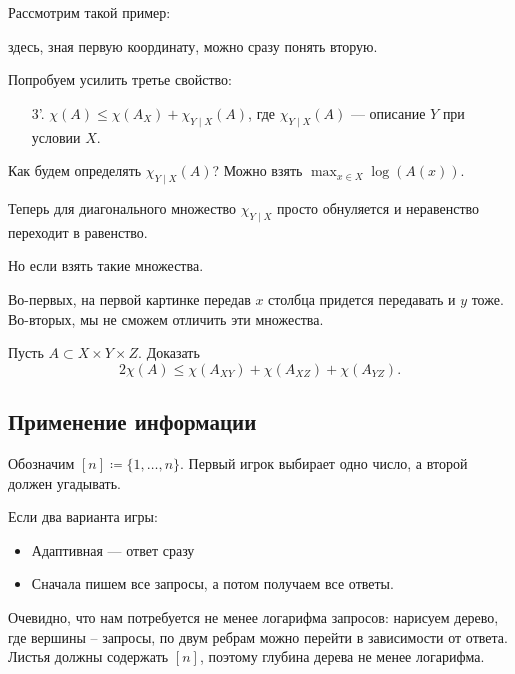 Рассмотрим такой пример: %
\begin{figure}[ht]
    \centering
    \label{fig:diag-img}
\end{figure}
здесь, зная первую координату, можно сразу понять вторую.

Попробуем усилить третье свойство:
\begin{enumerate}
	\item[3'.] $ \chi(A) \le \chi(A_{X}) + \chi_{Y \mid X} (A)$, где $ \chi _{Y \mid X}(A)$ --- описание $ Y$ при условии $ X$.
\end{enumerate} 
Как будем определять $ \chi_{Y \mid X} (A)$?
Можно взять $ \max_{x \in X} \log(A(x))$.

Теперь для диагонального множество $ \chi_{Y \mid X}$ просто обнуляется и неравенство переходит в равенство.

Но если взять такие множества. 
\begin{figure}[ht]
    \centering
    \label{fig:corner-img}
\end{figure}
Во-первых, на первой картинке передав $ x$ столбца придется передавать  и $ y$ тоже. Во-вторых, мы не сможем отличить эти множества.
\begin{prac}
	Пусть $ A \subset X \times Y \times Z$.
	Доказать
	\[
		2 \chi(A) \le \chi(A_{XY}) + \chi(A_{XZ}) + \chi(A_{YZ})
	.\] 
\end{prac}

\subsection{Применение информации}
Обозначим $ [n] \coloneqq \{1, \ldots , n\}$.
Первый игрок выбирает одно число, а второй должен угадывать.

Если два варианта игры:
\begin{itemize}
	\item Адаптивная --- ответ сразу
	\item Сначала пишем все запросы, а потом получаем все ответы.
\end{itemize}
Очевидно, что нам потребуется не менее логарифма запросов: нарисуем дерево, где вершины -- запросы, по двум ребрам можно перейти в зависимости от ответа. Листья должны содержать $ [n]$, поэтому глубина дерева не менее логарифма.
\begin{figure}[ht]
    \centering
    \label{fig:graph-img}
\end{figure}

